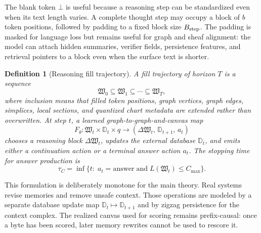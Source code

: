 \documentclass[11pt]{article}
\newtheorem{definition}[theorem]{Definition}
\numberwithin{equation}{section}
\begin{document}
The blank token $\bot$ is useful because a reasoning step can be standardized even when its text length varies. A complete thought step may occupy a block of $b$ token positions, followed by padding to a fixed block size $B_{\rm step}$. The padding is masked for language loss but remains useful for graph and sheaf alignment: the model can attach hidden summaries, verifier fields, persistence features, and retrieval pointers to a block even when the surface text is shorter.

\begin{definition}[Reasoning fill trajectory]
A fill trajectory of horizon $T$ is a sequence
\begin{equation}
\mathfrak{W}_0\subseteq \mathfrak{W}_1\subseteq\cdots\subseteq \mathfrak{W}_T,
\end{equation}
where inclusion means that filled token positions, graph vertices, graph edges, simplices, local sections, and quantized chart metadata are extended rather than overwritten. At step $t$, a learned graph-to-graph-and-canvas map
\begin{equation}
F_\theta:\mathfrak{W}_t\times\mathbb{D}_t\times q\longrightarrow (\Delta\mathfrak{W}_t,\,\mathbb{D}_{t+1},\,a_t)
\end{equation}
chooses a reasoning block $\Delta\mathfrak{W}_t$, updates the external database $\mathbb{D}_t$, and emits either a continuation action or a terminal answer action $a_t$. The stopping time for answer production is
\begin{equation}
\tau_C=\inf\{t:\;a_t=\mathrm{answer}\;\text{and}\;L(\mathfrak{W}_t)\le C_{\max}\}.
\end{equation}
\end{definition}

This formulation is deliberately monotone for the main theory. Real systems revise memories and remove unsafe context. Those operations are modeled by a separate database update map $\mathbb{D}_t\mapsto\mathbb{D}_{t+1}$ and by zigzag persistence for the context complex. The realized canvas used for scoring remains prefix-causal: once a byte has been scored, later memory rewrites cannot be used to rescore it.
\end{document}
